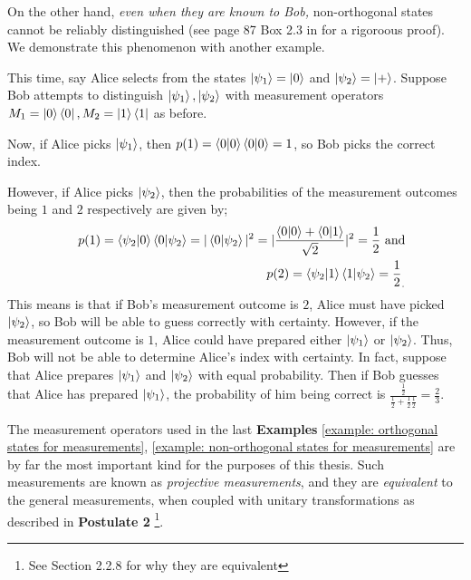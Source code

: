 On the other hand, {\emph{even when they are known to Bob,}} non-orthogonal states cannot be reliably distinguished (see page 87 Box 2.3 in \cite{Nielsen} for a rigoroous proof).  We demonstrate this phenomenon with another example.
\begin{example} \label{example: non-orthogonal states for measurements}
This time, say Alice selects from the states $\ket{\psi_1}=\ket{0}$ and  $\ket{\psi_2}=\ket{+}$. Suppose Bob attempts to distinguish $\ket{\psi_1}, \ket{\psi_2}$ with measurement operators $M_1=\ket{0}\bra{0}, M_2=\ket{1}\bra{1}$ as before.

Now, if Alice picks $\ket{\psi_1}$, then $p(1)=\braket{0 |0}\braket{0|0}=1$, so Bob picks the correct index. 

However, if Alice picks $\ket{\psi_2}$, then the probabilities of the measurement outcomes being $1$ and $2$ respectively are given by;
\begin{eqnarray}
    & &p(1)=\braket{\psi_2|0}\braket{0|\psi_2}=|\braket{0|\psi_2}|^2=|\frac{\braket{0|0}+\braket{0|1}}{\sqrt{2}}|^2=\frac{1}{2}\textrm{  and}\\
    & &p(2)=\braket{\psi_2|1}\braket{1|\psi_2}={\frac{1}{2}}_.
\end{eqnarray}
This means is that if Bob's measurement outcome is $2$, Alice must have picked $\ket{\psi_2}$, so Bob will be able to guess correctly with certainty. However, if the measurement outcome is $1$, Alice could have prepared either $\ket{\psi_1}$ or $\ket{\psi_2}$.  Thus, Bob will not be able to determine Alice's index with certainty.  In fact, suppose that Alice prepares $\ket{\psi_1}$ and $\ket{\psi_2}$ with equal probability.  Then if Bob guesses that Alice has prepared $\ket{\psi_1}$, the probability of him being correct is $\frac{\frac{1}{2}}{\frac{1}{2}+\frac{1}{2}\frac{1}{2}}=\frac{2}{3}$.
\end{example}


\label{subsection:projective measurement}
The measurement operators used in the last {\bf{Examples}} \ref{example: orthogonal states for measurements}, \ref{example: non-orthogonal states for measurements} are by far the most important kind for the purposes of this thesis.  Such measurements are known as \textit{projective measurements}, and they are \textit{equivalent} to the general measurements, when coupled with unitary transformations as described in {\bf{Postulate 2}} \footnote{See \cite{Nielsen} Section 2.2.8 for why they are equivalent}. 


